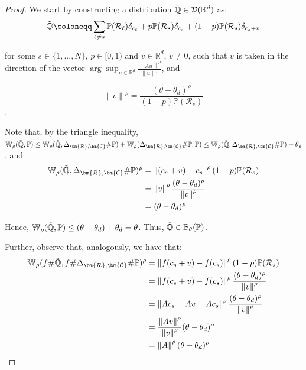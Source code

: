 \documentclass[11pt, a4paper, oneside,reqno]{amsart}
\theoremstyle{plain}
\def\prob{\mathbb{P}}
\def\probQ{\mathbb{Q}}
\def\wasserstein{{\mathbb{W}}}
\newcommand{\norm}[1]{\left\lVert#1\right\rVert}
\def\realNum{{\mathbb{R}}}
\def\sD{{\mathcal{D}}}
\def\sR{{\mathcal{R}}}
\def\bsR{{\bm{\mathcal{R}}}}
\def\bsC{{\bm{\mathcal{C}}}}
\begin{document}
    \begin{proof}
    We start by constructing a distribution $\Tilde{\probQ} \in \sD(\realNum^d)$ as: 
    \begin{align*}
        \Tilde{\probQ} \coloneqq \sum_{\ell \neq s} \prob(\sR_\ell) \delta_{c_\ell} + p \prob(\sR_s) \delta_{c_s} + (1-p) \prob(\sR_s) \delta_{c_s + v}
    \end{align*}
    
    for some $s \in \{1, ..., N\}$, $p \in [0, 1)$ and $v \in \realNum^d$, $v \neq 0$, such that $v$ is taken in the direction of the vector $\arg\sup_{u \in \realNum^d} \frac{\norm{Au}^\rho}{\norm{u}^\rho}$, and
    
    $$\norm{v}^\rho = \frac{(\theta-\theta_d)^\rho}{(1-p)\prob(\sR_s)}$$. 
    
    Note that, by the triangle inequality, $\wasserstein_\rho(\Tilde{\probQ}, \prob) \leq \wasserstein_\rho(\Tilde{\probQ}, \Delta_{\bsR, \bsC}\#\prob) + \wasserstein_\rho(\Delta_{\bsR, \bsC}\#\prob, \prob) \leq \wasserstein_\rho(\Tilde{\probQ}, \Delta_{\bsR, \bsC}\#\prob) + \theta_d$, and
    \begin{align*}
        \wasserstein_\rho(\Tilde{\probQ}, \Delta_{\bsR, \bsC}\#\prob)^\rho &= \norm{(c_s + v) - c_s}^\rho (1-p)\prob(\sR_s) \\ 
        &= \norm{v}^\rho \frac{(\theta-\theta_d)^\rho}{\norm{v}^\rho} \\ 
        &= (\theta-\theta_d)^\rho
    \end{align*}
    
    Hence, $\wasserstein_\rho(\Tilde{\probQ}, \prob) \leq (\theta-\theta_d) + \theta_d = \theta$. Thus, $\Tilde{\probQ} \in \mathbb{B}_{\theta}(\prob)$.
    
    Further, observe that, analogously, we have that:
    \begin{align*}
        \wasserstein_\rho(f \# \Tilde{\probQ}, f \# \Delta_{\bsR, \bsC}\#\prob)^\rho &= \norm{f(c_s + v) - f(c_s)}^\rho (1-p)\prob(\sR_s) \\
        &= \norm{f(c_s + v) - f(c_s)}^\rho \frac{(\theta-\theta_d)^\rho}{\norm{v}^\rho} \\
        &= \norm{Ac_s + Av - Ac_s}^\rho \frac{(\theta-\theta_d)^\rho}{\norm{v}^\rho} \\
        &= \frac{\norm{Av}^\rho}{\norm{v}^\rho} (\theta-\theta_d)^\rho \\
        &= \norm{A}^\rho (\theta-\theta_d)^\rho
    \end{align*}
    

\end{proof}
\end{document}
